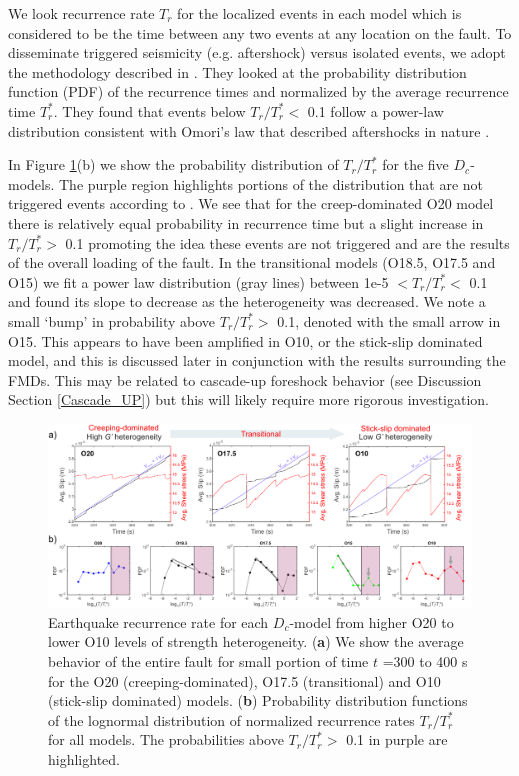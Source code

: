 \documentclass[preprint,1p, 10pt,authoryear]{elsarticle}
\begin{document}
We look recurrence rate $T_{r}$ for the localized events in each model which is considered to be the time between any two events at any location on the fault. To disseminate triggered  seismicity (e.g. aftershock) versus isolated events, we adopt the methodology described in \citet{Lengline2009}. They looked at the probability distribution function (PDF) of the recurrence times and normalized by the average recurrence time $T^{*}_{r}$.  They found that events below $T_{r}/T^{*}_{r} <$ 0.1 follow a power-law distribution consistent with Omori's law that described aftershocks in nature \citep[e.g.,][]{Lengline2009}. 

In Figure \ref{fig11}(b) we show the probability distribution of $T_{r}/T^{*}_{r}$ for the five $D_{c}$-models. The purple region highlights portions of the distribution that are not triggered events according to \citet{Lengline2009}. We see that for the creep-dominated O20 model there is relatively equal probability in recurrence time but a slight increase in  $T_{r}/T^{*}_{r} >$ 0.1 promoting the idea these events are not triggered and are the results of the overall loading of the fault. In the transitional models (O18.5, O17.5 and O15) we fit a power law distribution (gray lines) between 1e-5 $< T_{r}/T^{*}_{r} <$ 0.1 and found its slope to decrease as the heterogeneity was decreased. We note a small `bump' in probability above $T_{r}/T^{*}_{r} >$ 0.1, denoted with the small arrow in O15. This appears to have been amplified in O10, or the stick-slip dominated model, and this is discussed later in conjunction with the results surrounding the FMDs.  This may be related to cascade-up foreshock behavior (see Discussion Section \ref{Cascade_UP}) but this will likely require more rigorous investigation.

\begin{figure}
    	\centering
	\includegraphics[scale = 0.9]{FIG11_revised.pdf} 
	\caption{Earthquake recurrence rate for each $D_{c}$-model from higher O20 to lower O10 levels of strength heterogeneity. (\textbf{a}) We show the average behavior of the entire fault for small portion of time $t$ =300 to 400 s for the O20 (creeping-dominated), O17.5 (transitional) and O10 (stick-slip dominated) models. (\textbf{b}) Probability distribution functions of the lognormal distribution of normalized recurrence rates $T_{r}/T^{*}_{r}$ for all models. The probabilities above $T_{r}/T^{*}_{r} >$ 0.1 in purple are highlighted.}
	\label{fig11}
\end{figure}
\end{document}
